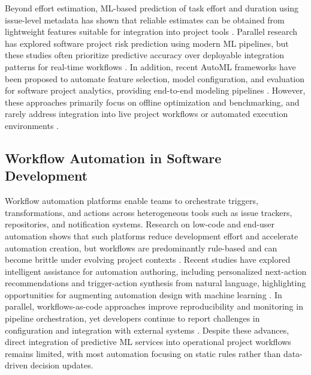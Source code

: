 \documentclass[conference]{IEEEtran}
\begin{document}
Beyond effort estimation, ML-based prediction of task effort and duration using issue-level metadata has shown that reliable estimates can be obtained from lightweight features suitable for integration into project tools \cite{sousa2023_task_effort}. Parallel research has explored software project risk prediction using modern ML pipelines, but these studies often prioritize predictive accuracy over deployable integration patterns for real-time workflows \cite{mahmud2022_risk_slr}. In addition, recent AutoML frameworks have been proposed to automate feature selection, model configuration, and evaluation for software project analytics, providing end-to-end modeling pipelines \cite{automl_se_slr}. However, these approaches primarily focus on offline optimization and benchmarking, and rarely address integration into live project workflows or automated execution environments \cite{automl_se_slr, prinz2021_lowcode_slr, yasmin2024_airflow_wac}.



\subsection{Workflow Automation in Software Development}

Workflow automation platforms enable teams to orchestrate triggers, transformations, and actions across heterogeneous tools such as issue trackers, repositories, and notification systems. Research on low-code and end-user automation shows that such platforms reduce development effort and accelerate automation creation, but workflows are predominantly rule-based and can become brittle under evolving project contexts \cite{prinz2021_lowcode_slr}. Recent studies have explored intelligent assistance for automation authoring, including personalized next-action recommendations and trigger-action synthesis from natural language, highlighting opportunities for augmenting automation design with machine learning \cite{gupta2023_action_suggestions, yusuf2022_tap_generation}. In parallel, workflows-as-code approaches improve reproducibility and monitoring in pipeline orchestration, yet developers continue to report challenges in configuration and integration with external systems \cite{yasmin2024_airflow_wac}. Despite these advances, direct integration of predictive ML services into operational project workflows remains limited, with most automation focusing on static rules rather than data-driven decision updates.
\end{document}
